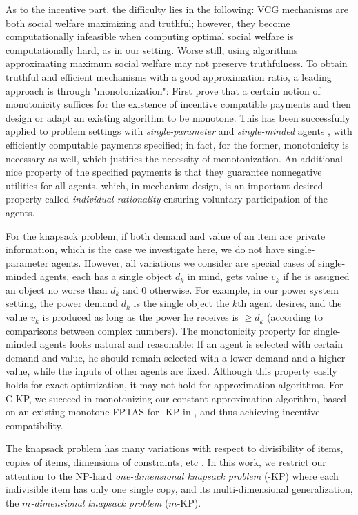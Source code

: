 \documentclass{aamas2013}
\begin{document}
As to the incentive part, the difficulty lies in the following: VCG mechanisms \cite{N07book} are both social welfare maximizing and truthful; however, they become computationally infeasible when computing optimal social welfare is computationally hard, as in our setting.  Worse still, using algorithms approximating maximum social welfare may not preserve truthfulness.  
To obtain truthful and efficient mechanisms with a good approximation ratio, a leading approach is through "monotonization": First prove that a certain notion of monotonicity suffices for the existence of incentive compatible payments and then design or adapt an existing algorithm to be monotone.  This has been successfully applied to problem settings with {\em single-parameter} \cite{archer2001truthful} and {\em single-minded} agents \cite{LOS99mono}, with efficiently computable payments specified; in fact, for the former, monotonicity is necessary as well, which justifies the necessity of monotonization.  An additional nice property of the specified payments is that they guarantee nonnegative utilities for all agents, which, in mechanism design, is an important desired property called {\em individual rationality} ensuring voluntary participation of the agents. 

For the knapsack problem, if both demand and value of an item are private information, which is the case we investigate here, we do not have single-parameter agents. However, all variations we consider are special cases of single-minded agents, each has a single object $d_k$ in mind, gets value $v_k$ if he is assigned an object no worse than $d_k$ and 0 otherwise.  For example, in our power system setting, the power demand $d_k$ is the single object the $k$th agent desires, and the value $v_k$ is produced as long as the power he receives is $\geq d_k$ (according to comparisons between complex numbers).  The monotonicity property for single-minded agents looks natural and reasonable: If an agent is selected with certain demand and value, he should remain selected with a lower demand and a higher value, while the inputs of other agents are fixed.  Although this property easily holds for exact optimization, 
it may not hold for approximation algorithms.   
For {\sc C-KP}, we succeed in monotonizing our constant approximation algorithm, based on an existing monotone FPTAS for {-KP} in \cite{BKV05KS}, and thus achieving incentive compatibility.



\smallskip

The knapsack problem has many variations with respect to divisibility of items, copies of items, dimensions of constraints, etc \cite{KPP10book}.
In this work, we restrict our attention to the NP-hard {\em one-dimensional knapsack problem} ({-KP}) where each indivisible item has only one single copy, and its multi-dimensional generalization, the {\em $m$-dimensional knapsack problem} ({\sc $m$-KP}).
\end{document}
